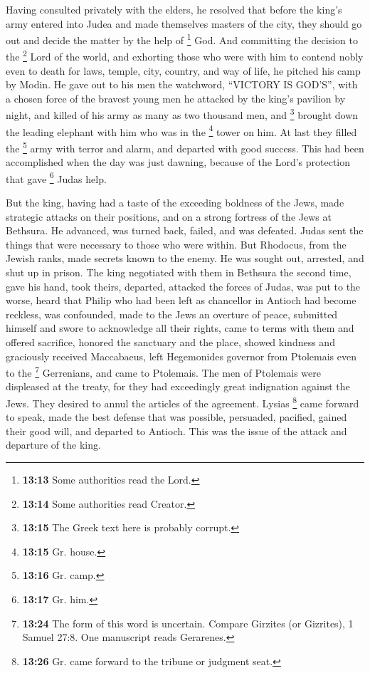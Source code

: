  Having consulted privately with the elders, he resolved
that before the king's army entered into Judea and made themselves
masters of the city, they should go out and decide the matter by the
help of \footnote{\textbf{13:13} Some authorities read the Lord.} God.
 And committing the decision to the \footnote{\textbf{13:14}
  Some authorities read Creator.} Lord of the world, and exhorting those
who were with him to contend nobly even to death for laws, temple, city,
country, and way of life, he pitched his camp by Modin. 
He gave out to his men the watchword, ``VICTORY IS GOD'S'', with a
chosen force of the bravest young men he attacked by the king's pavilion
by night, and killed of his army as many as two thousand men, and
\footnote{\textbf{13:15} The Greek text here is probably corrupt.}
brought down the leading elephant with him who was in the \footnote{\textbf{13:15}
  Gr. house.} tower on him.  At last they filled the
\footnote{\textbf{13:16} Gr. camp.} army with terror and alarm, and
departed with good success.  This had been accomplished
when the day was just dawning, because of the Lord's protection that
gave \footnote{\textbf{13:17} Gr. him.} Judas help.

 But the king, having had a taste of the exceeding
boldness of the Jews, made strategic attacks on their positions,
 and on a strong fortress of the Jews at Bethsura. He
advanced, was turned back, failed, and was defeated. 
Judas sent the things that were necessary to those who were within.
 But Rhodocus, from the Jewish ranks, made secrets known
to the enemy. He was sought out, arrested, and shut up in prison.
 The king negotiated with them in Bethsura the second
time, gave his hand, took theirs, departed, attacked the forces of
Judas, was put to the worse,  heard that Philip who had
been left as chancellor in Antioch had become reckless, was confounded,
made to the Jews an overture of peace, submitted himself and swore to
acknowledge all their rights, came to terms with them and offered
sacrifice, honored the sanctuary and the place,  showed
kindness and graciously received Maccabaeus, left Hegemonides governor
from Ptolemais even to the \footnote{\textbf{13:24} The form of this
  word is uncertain. Compare Girzites (or Gizrites), 1 Samuel 27:8. One
  manuscript reads Gerarenes.} Gerrenians,  and came to
Ptolemais. The men of Ptolemais were displeased at the treaty, for they
had exceedingly great indignation against the Jews. They desired to
annul the articles of the agreement.  Lysias \footnote{\textbf{13:26}
  Gr. came forward to the tribune or judgment seat.} came forward to
speak, made the best defense that was possible, persuaded, pacified,
gained their good will, and departed to Antioch. This was the issue of
the attack and departure of the king.

